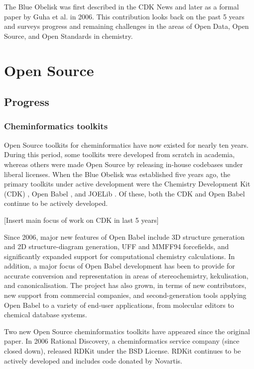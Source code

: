 \documentclass[10pt]{bmc_article}
\newenvironment{bmcformat}{\begin{raggedright}\baselineskip20pt\sloppy\setboolean{publ}{false}}{\end{raggedright}\baselineskip20pt\sloppy}
\begin{document}
\begin{bmcformat}
The Blue Obelisk was first described in the CDK News \cite{CDKNewsBO} and
later as a formal paper by Guha et al.\cite{Guha2006} in
2006. This
contribution looks back on the past 5 years and surveys progress and
remaining challenges in the areas of Open Data, Open Source, and Open
Standards in chemistry.

\section*{Open Source}
  \subsection*{Progress}

\subsubsection*{Cheminformatics toolkits}

Open Source toolkits for cheminformatics have now existed for nearly
ten years. During this period, some toolkits were developed from
scratch in academia, whereas others were made Open Source by releasing in-house
codebases under liberal licenses. When the Blue Obelisk was
established five years ago, the primary toolkits under active development
were the Chemistry Development Kit (CDK)
\cite{Steinbeck2003, Steinbeck2006}, Open Babel \cite{WebOpenBabel},
and JOELib \cite{WebJOELib}. Of these, both the CDK and Open Babel
continue to be actively developed.

[Insert main focus of work on CDK in last 5 years]

Since 2006, major new features of Open Babel include 3D structure
generation and 2D structure-diagram generation, UFF and MMFF94
forcefields, and significantly expanded support for computational
chemistry calculations. In addition, a major focus of Open Babel development
has been to provide for accurate conversion and representation in
areas of stereochemistry, kekulisation, and canonicalisation. The
project has also grown, in terms of new contributors, new support from
commercial companies, and second-generation tools applying Open Babel
to a variety of end-user applications, from molecular editors to
chemical database systems.

Two new Open Source cheminformatics toolkits have appeared since the
original paper. In 2006 Rational Discovery, a cheminformatics service
company (since closed down), released RDKit \cite{WebRDKit} under the
BSD License. RDKit continues to be actively developed and includes
code donated by Novartis.


\end{bmcformat}
\end{document}
